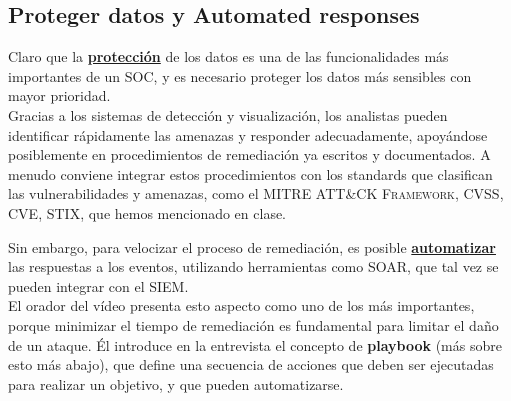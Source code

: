 \subsection{Proteger datos y Automated responses}

Claro que la \ul{\textbf{protección}} de los datos es una de las funcionalidades más importantes de un SOC, y es necesario proteger los datos más sensibles con mayor prioridad.\\
Gracias a los sistemas de detección y visualización, los analistas pueden identificar rápidamente las amenazas y responder adecuadamente, apoyándose posiblemente en procedimientos de remediación ya escritos y documentados. 
A menudo conviene integrar estos procedimientos con los standards que clasifican las vulnerabilidades y amenazas, como el \textsc{MITRE ATT\&CK Framework}, \textsc{CVSS}, \textsc{CVE}, \textsc{STIX}, que hemos mencionado en clase. 

Sin embargo, para velocizar el proceso de remediación, es posible \ul{\textbf{automatizar}} las respuestas a los eventos, utilizando herramientas como \textsc{SOAR}, que tal vez se pueden integrar con el \textsc{SIEM}.\\
El orador del vídeo presenta esto aspecto como uno de los más importantes, porque minimizar el tiempo de remediación es fundamental para limitar el daño de un ataque.
Él introduce en la entrevista el concepto de \textbf{playbook} (más sobre esto más abajo), que define una secuencia de acciones que deben ser ejecutadas para realizar un objetivo, y que pueden automatizarse.






